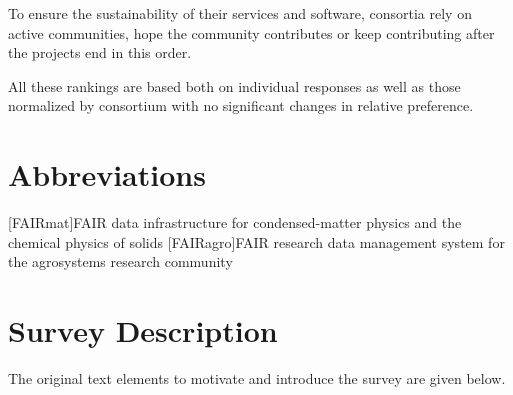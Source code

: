 \documentclass[headsepline,titlepage,twoside,12pt,toc=flat,headings=normal]{scrreprt}
\begin{document}
To ensure the sustainability of their services and software, consortia rely on active communities, hope the community contributes or keep contributing after the projects end in this order.

All these rankings are based both on individual responses as well as those normalized by consortium with no significant changes in relative preference.


\chapter*{Abbreviations}%

\begin{acronym}
[FAIRmat]{FAIR data infrastructure for condensed-matter physics and the chemical physics of solids}
[FAIRagro]{FAIR research data management system for the agrosystems research community}
\end{acronym}

\setcounter{tocdepth}{1}%
\tableofcontents
{}
\listoffigures
{}
\listoftables
{}


\chapter{Survey Description}\label{ch:questionnaire}
The original text elements to motivate and introduce the survey are given below.
\end{document}
